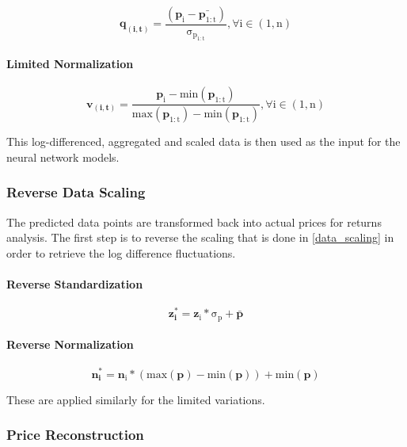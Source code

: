 \documentclass[a4paper,11pt,oneside]{article}
\theoremstyle{plain}
\theoremstyle{definition}
\begin{document}
\begin{equation}
\mathbf{q_{(i, t)}} =\mathrm{ \frac{(\mathbf{p}_i - \bar{\mathbf{p}_{1:t}}) }{\sigma_{p_{1:t}}} , \forall  i \in (1, n)}
\end{equation}

\paragraph{Limited Normalization}

\begin{equation}
\mathbf{v_{(i, t)}}  = \mathrm{ \frac{\mathbf{p}_i - min(\mathbf{p}_{1:t}) }{max(\mathbf{p}_{1:t}) - min(\mathbf{p}_{1:t})} , \forall  i \in (1, n)}
\end{equation}


This log-differenced, aggregated and scaled data is then used as the input for the neural network models.

\subsubsection{Reverse Data Scaling}\label{data_reverse_scaling}

The predicted data points are transformed back into actual prices for returns analysis. The first step is to reverse the scaling that is done in \ref{data_scaling} in order to retrieve the log difference fluctuations.

\paragraph{Reverse Standardization}

\begin{equation}
\mathbf{z^{*}_i} = \mathrm{{\mathbf{z}_i} * \sigma_p + \mathbf{\bar{p}}}
\end{equation}

\paragraph{Reverse Normalization}

\begin{equation}
\mathbf{n^{*}_i} = \mathrm{\mathbf{n}_i * (max(\mathbf{p}) - min(\mathbf{p})) + min(\mathbf{p})}
\end{equation}

These are applied similarly for the limited variations.

\subsubsection{Price Reconstruction}\label{data_price_recon}
\end{document}
